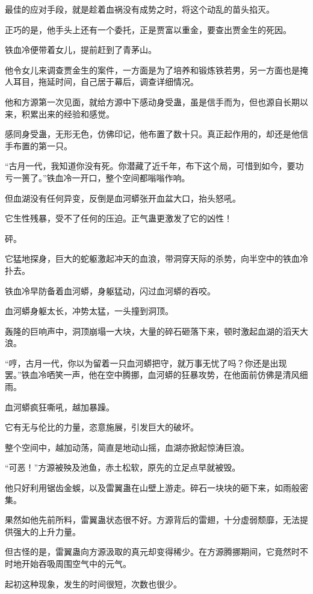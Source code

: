 \begin{this_body}
最佳的应对手段，就是趁着血祸没有成势之时，将这个动乱的苗头掐灭。

正巧的是，他手头上还有一个委托，正是贾富以重金，要查出贾金生的死因。

铁血冷便带着女儿，提前赶到了青茅山。

他令女儿来调查贾金生的案件，一方面是为了培养和锻炼铁若男，另一方面也是掩人耳目，拖延时间，自己居于幕后，调查详细情况。

他和方源第一次见面，就给方源中下感动身受蛊，虽是信手而为，但也源自长期以来，积累出来的经验和感觉。

感同身受蛊，无形无色，仿佛印记，他布置了数十只。真正起作用的，却还是他信手布置的第一只。

“古月一代，我知道你没有死。你潜藏了近千年，布下这个局，可惜到如今，要功亏一篑了。”铁血冷一开口，整个空间都嗡嗡作响。

但血湖没有任何异变，反倒是血河蟒张开血盆大口，抬头怒吼。

它生性残暴，受不了任何的压迫。正气蛊更激发了它的凶性！

砰。

它猛地探身，巨大的蛇躯激起冲天的血浪，带洞穿天际的杀势，向半空中的铁血冷扑去。

铁血冷早防备着血河蟒，身躯猛动，闪过血河蟒的吞咬。

血河蟒身躯太长，冲势太猛，一头撞到洞顶。

轰隆的巨响声中，洞顶崩塌一大块，大量的碎石砸落下来，顿时激起血湖的滔天大浪。

“哼，古月一代，你以为留着一只血河蟒把守，就万事无忧了吗？你还是出现罢。”铁血冷哂笑一声，他在空中腾挪，血河蟒的狂暴攻势，在他面前仿佛是清风细雨。

血河蟒疯狂嘶吼，越加暴躁。

它有无与伦比的力量，恣意施展，引发巨大的破坏。

整个空间中，越加动荡，简直是地动山摇，血湖亦掀起惊涛巨浪。

“可恶！”方源被殃及池鱼，赤土松软，原先的立足点早就被毁。

他只好利用锯齿金蜈，以及雷翼蛊在山壁上游走。碎石一块块的砸下来，如雨般密集。

果然如他先前所料，雷翼蛊状态很不好。方源背后的雷翅，十分虚弱颓靡，无法提供强大的上升力量。

但古怪的是，雷翼蛊向方源汲取的真元却变得稀少。在方源腾挪期间，它竟然时不时地开始吞吸周围空气中的元气。

起初这种现象，发生的时间很短，次数也很少。


\end{this_body}
